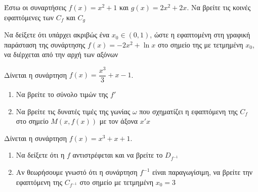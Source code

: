 \documentclass{presentation}
\begin{document}
\begin{askisi}
    Έστω οι συναρτήσεις $f(x)=x^2+1$ και $g(x)=2x^2+2x$. Να βρείτε τις κοινές εφαπτόμενες των $C_f$ και $C_g$

\end{askisi}

\begin{askisi}
    Να δείξετε ότι υπάρχει ακριβώς ένα $x_0\in (0,1)$, ώστε η εφαπτομένη στη γραφική παράσταση της συνάρτησης $f(x)=-2x^2+\ln x$ στο σημείο της με τετμημένη $x_0$, να διέρχεται από την αρχή των αξόνων

\end{askisi}

\begin{askisi}
    Δίνεται η συνάρτηση $f(x)=\dfrac{x^3}{3}+x-1$.
    \begin{enumerate}
        \item<1-> Να βρείτε το σύνολο τιμών της $f'$
        \item<2-> Να βρείτε τις δυνατές τιμές της γωνίας $ω$ που σχηματίζει η εφαπτόμενη της $C_f$ στο σημείο $Μ(x,f(x))$ με τον άξονα $x'x$
    \end{enumerate}

\end{askisi}

\begin{askisi}
    Δίνεται η συνάρτηση $f(x)=x^3+x+1$.
    \begin{enumerate}
        \item<1-> Να δείξετε ότι η $f$ αντιστρέφεται και να βρείτε το $D_{f^{-1}}$
        \item<2-> Αν θεωρήσουμε γνωστό ότι η συνάρτηση $f^{-1}$ είναι παραγωγίσιμη, να βρείτε την εφαπτόμενη της $C_{f^{-1}}$ στο σημείο με τετμημένη $x_0=3$
    \end{enumerate}


\end{askisi}
\end{document}
